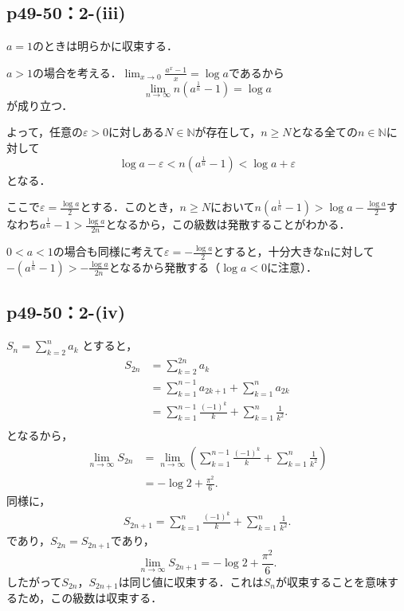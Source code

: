 \documentclass[uplatex,dvipdfmx,a4paper,10pt,fleqn]{jsarticle}
\begin{document}
    \subsection*{p49-50：2-(iii)}

	\begin{screen}
        $a=1$のときは明らかに収束する．
  
        $a>1$の場合を考える．$\lim_{x \to 0} \frac{a^x-1}{x} = \log a$であるから
        \[
        \lim_{n \to \infty} n(a^{\frac{1}{n}}-1) = \log a
        \]
        が成り立つ．
      
        よって，任意の$\varepsilon > 0$に対しある$N \in \mathbb{N}$が存在して，$n \geq N$となる全ての$n \in \mathbb{N}$に対して
        \[
        \log a - \varepsilon < n(a^{\frac{1}{n}}-1) < \log a + \varepsilon
        \]
        となる．
      
        ここで$\varepsilon = \frac{\log a}{2}$とする．このとき，$n \geq N$において$ n(a^{\frac{1}{n}}-1) > \log a - \frac{\log a}{2}$すなわち$ a^{\frac{1}{n}}-1 > \frac{\log a}{2n}$となるから，この級数は発散することがわかる．
      
        $0<a<1$の場合も同様に考えて$\varepsilon = -\frac{\log a}{2}$とすると，十分大きなnに対して$-(a^{\frac{1}{n}}-1) > -\frac{\log a}{2n}$となるから発散する（$\log a < 0$に注意）．      
	\end{screen}


    \subsection*{p49-50：2-(iv)}

    \begin{screen}
  $S_{n} = \sum ^{n}_{k=2} a_k$ とすると，
  \begin{align*}
    S_{2n} &= \sum ^{2n}_{k=2} a_{k}\\
    &= \sum ^{n-1}_{k=1} a_{2k+1} + \sum ^{n}_{k=1} a_{2k} \\
    &= \sum ^{n-1}_{k=1} \frac{(-1)^k}{k} + \sum ^{n}_{k=1} \frac{1}{k^2}. \\
  \end{align*}
  となるから，
  \begin{align*}
   \lim_{n \to \infty} S_{2n}&=\lim_{n \to \infty} \left (\sum ^{n-1}_{k=1} \frac{(-1)^k}{k} + \sum ^{n}_{k=1} \frac{1}{k^2} \right ) \\
   & = -\log 2 + \frac{\pi^2}{6}.
  \end{align*}
  同様に，
  \begin{align*}
    S_{2n+1} = \sum ^{n}_{k=1} \frac{(-1)^k}{k} + \sum ^{n}_{k=1} \frac{1}{k^2}.
  \end{align*}
  であり，$S_{2n}=S_{2n+1}$であり，
  \[
    \lim_{n \to \infty} S_{2n+1} = -\log 2 + \frac{\pi^2}{6}.
  \]
  したがって$S_{2n}$，$S_{2n+1}$は同じ値に収束する．これは$S_{n}$が収束することを意味するため，この級数は収束する．
\end{screen}
\end{document}
